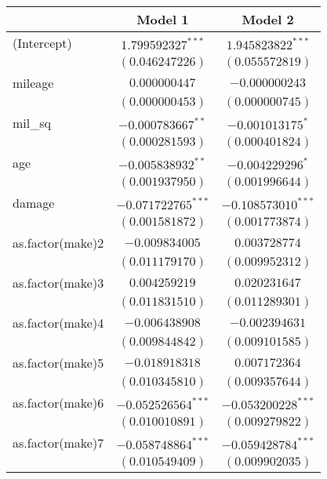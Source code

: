 
\begin{table}
\begin{center}
\begin{small}
\begin{tabular}{l c c}
\hline
 & Model 1 & Model 2 \\
\hline
(Intercept)        & $1.799592327^{***}$  & $1.945823822^{***}$  \\
                   & $(0.046247226)$      & $(0.055572819)$      \\
mileage            & $0.000000447$        & $-0.000000243$       \\
                   & $(0.000000453)$      & $(0.000000745)$      \\
mil\_sq            & $-0.000783667^{**}$  & $-0.001013175^{*}$   \\
                   & $(0.000281593)$      & $(0.000401824)$      \\
age                & $-0.005838932^{**}$  & $-0.004229296^{*}$   \\
                   & $(0.001937950)$      & $(0.001996644)$      \\
damage             & $-0.071722765^{***}$ & $-0.108573010^{***}$ \\
                   & $(0.001581872)$      & $(0.001773874)$      \\
as.factor(make)2   & $-0.009834005$       & $0.003728774$        \\
                   & $(0.011179170)$      & $(0.009952312)$      \\
as.factor(make)3   & $0.004259219$        & $0.020231647$        \\
                   & $(0.011831510)$      & $(0.011289301)$      \\
as.factor(make)4   & $-0.006438908$       & $-0.002394631$       \\
                   & $(0.009844842)$      & $(0.009101585)$      \\
as.factor(make)5   & $-0.018918318$       & $0.007172364$        \\
                   & $(0.010345810)$      & $(0.009357644)$      \\
as.factor(make)6   & $-0.052526564^{***}$ & $-0.053200228^{***}$ \\
                   & $(0.010010891)$      & $(0.009279822)$      \\
as.factor(make)7   & $-0.058748864^{***}$ & $-0.059428784^{***}$ \\
                   & $(0.010549409)$      & $(0.009902035)$      \\

\end{tabular}
\end{small}
\end{center}
\end{table}
